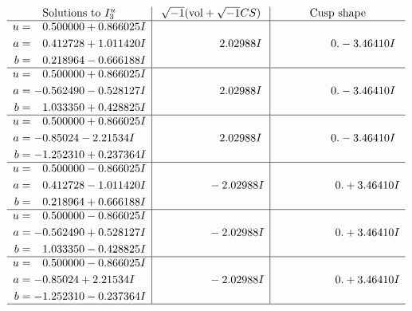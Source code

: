 \documentclass[1p]{elsarticle_modified}
\theoremstyle{definition}
\newcommand{\I}{\sqrt{-1}}
\begin{document}
$$\begin{array}{c|c|c}  
\text{Solutions to }I^u_{3}& \I (\text{vol} + \sqrt{-1}CS) & \text{Cusp shape}\\
 \hline 
\begin{aligned}
u &= \phantom{-}0.500000 + 0.866025 I \\
a &= \phantom{-}0.412728 + 1.011420 I \\
b &= \phantom{-}0.218964 - 0.666188 I\end{aligned}
 & \phantom{-0.000000 -}2.02988 I & \phantom{-0.000000 } 0. - 3.46410 I \\ \hline\begin{aligned}
u &= \phantom{-}0.500000 + 0.866025 I \\
a &= -0.562490 - 0.528127 I \\
b &= \phantom{-}1.033350 + 0.428825 I\end{aligned}
 & \phantom{-0.000000 -}2.02988 I & \phantom{-0.000000 } 0. - 3.46410 I \\ \hline\begin{aligned}
u &= \phantom{-}0.500000 + 0.866025 I \\
a &= -0.85024 - 2.21534 I \\
b &= -1.252310 + 0.237364 I\end{aligned}
 & \phantom{-0.000000 -}2.02988 I & \phantom{-0.000000 } 0. - 3.46410 I \\ \hline\begin{aligned}
u &= \phantom{-}0.500000 - 0.866025 I \\
a &= \phantom{-}0.412728 - 1.011420 I \\
b &= \phantom{-}0.218964 + 0.666188 I\end{aligned}
 & \phantom{-0.000000 } -2.02988 I & \phantom{-0.000000 -}0. + 3.46410 I \\ \hline\begin{aligned}
u &= \phantom{-}0.500000 - 0.866025 I \\
a &= -0.562490 + 0.528127 I \\
b &= \phantom{-}1.033350 - 0.428825 I\end{aligned}
 & \phantom{-0.000000 } -2.02988 I & \phantom{-0.000000 -}0. + 3.46410 I \\ \hline\begin{aligned}
u &= \phantom{-}0.500000 - 0.866025 I \\
a &= -0.85024 + 2.21534 I \\
b &= -1.252310 - 0.237364 I\end{aligned}
 & \phantom{-0.000000 } -2.02988 I & \phantom{-0.000000 -}0. + 3.46410 I\\
 \hline 
 \end{array}$$\newpage\newpage\renewcommand{\arraystretch}{1}
\end{document}
